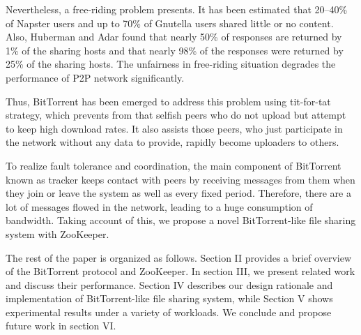\documentclass[conference]{IEEEtran}
\begin{document}
	Nevertheless, a free-riding problem presents. It has been estimated\cite{Measurement} that 20–40\% of Napster users and up to 70\% of Gnutella users shared little or no content. Also, Huberman and Adar\cite{Gnutella} found that nearly 50\% of responses are returned by 1\% of the sharing hosts and that nearly 98\% of the responses were returned by 25\% of the sharing hosts. The unfairness in free-riding situation degrades the performance of P2P network significantly. 

	Thus, BitTorrent has been emerged to address this problem using tit-for-tat strategy, which prevents from that selfish peers who do not upload but attempt to keep high download rates. It also assists those peers, who just participate in the network without any data to provide, rapidly become uploaders to others.
	
	To realize fault tolerance and coordination, the main component of BitTorrent known as tracker keeps contact with peers by receiving messages from them when they join or leave the system as well as every fixed period. Therefore, there are a lot of messages flowed in the network, leading to a huge consumption of bandwidth. Taking account of this, we propose a novel BitTorrent-like file sharing system with ZooKeeper. 
	
	The rest of the paper is organized as follows. Section II provides a brief overview of the BitTorrent protocol and ZooKeeper. In section III, we present related work and discuss their performance. Section IV describes our design rationale and implementation of BitTorrent-like file sharing system, while Section V shows experimental results under a variety of workloads. We conclude and propose future work in section VI. 
	
	
\end{document}
